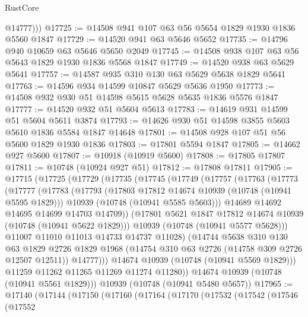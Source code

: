 \begin{lexlean}{RustCore}
\begin{coremodule}
          @14777)))
@17725 := @14508 @941 @107 @63 @56 @5654 @1829 @1930 @1836 @5560 @1847
@17729 := @14520 @941 @63 @5646 @5652
@17735 := @14796 @940 @10659 @63 @5646 @5650 @2049
@17745 := @14508 @938 @107 @63 @56 @5643 @1829 @1930 @1836 @5568 @1847
@17749 := @14520 @938 @63 @5629 @5641
@17757 := @14587 @935 @310 @130 @63 @5629 @5638 @1829 @5641
@17763 := @14596 @934 @14599 @10847 @5629 @5636 @1950
@17773 := @14508 @932 @930 @51 @14598 @5615 @5628 @5635 @1836 @5576 @1847
@17777 := @14520 @932 @51 @5604 @5613
@17783 := @14619 @931 @14599 @51 @5604 @5611 @3874
@17793 := @14626 @930 @51 @14598 @3855 @5603 @5610 @1836 @5584 @1847 @14648
@17801 := @14508 @928 @107 @51 @56 @5600 @1829 @1930 @1836
@17803 := @17801 @5594 @1847
@17805 := @14662 @927 @5600
@17807 := @10918 (@10919 @5600)
@17808 := @17805 @17807
@17811 := @10748 (@10924 @927 @51)
@17812 := @17808 @17811
@17905 := @17715
    (@17725
      (@17729
        (@17735
          (@17745
            (@17749
              (@17757
                (@17763
                  (@17773
                    (@17777
                      (@17783
                        (@17793
                          (@17803 @17812 @14674 @10939 (@10748 (@10941 @5595 @1829)))
                          @10939
                          (@10748 (@10941 @5585 @5603)))
                        @14689
                        @14692
                        @14695
                        @14699
                        @14703
                        @14709))
                    (@17801 @5621 @1847 @17812 @14674 @10939 (@10748 (@10941 @5622 @1829)))
                    @10939
                    (@10748 (@10941 @5577 @5628)))
                  @11007
                  @11010
                  @11013
                  @14733
                  @14737
                  @11028)
                (@14744
                  @5638
                  @310
                  @130
                  @63
                  @1829
                  @2726
                  @1829
                  @1968
                  (@14754 @310 @63 @2726 (@14758 @309 @2726 @12507 @12511))
                  @14777)))
            @14674
            @10939
            (@10748 (@10941 @5569 @1829)))
          @11259
          @11262
          @11265
          @11269
          @11274
          @11280))
      @14674
      @10939
      (@10748 (@10941 @5561 @1829)))
    @10939
    (@10748 (@10941 @5480 @5657))
@17965 := @17140
    (@17144
      (@17150
        (@17160
          (@17164
            (@17170
              (@17532
                (@17542
                  (@17546
                    (@17552

\end{coremodule}
\end{lexlean}
